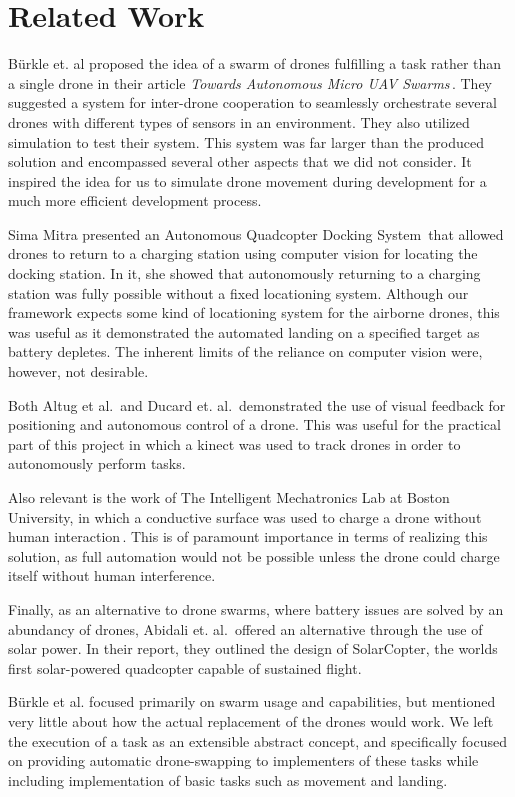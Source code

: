\section{Related Work}
B\"urkle et. al proposed the idea of a swarm of drones fulfilling a task rather than a single drone in their article \textit{Towards Autonomous Micro UAV Swarms}\,\cite{burkleetal}. They suggested a system for inter-drone cooperation to seamlessly orchestrate several drones with different types of sensors in an environment. They also utilized simulation to test their system. This system was far larger than the produced solution and encompassed several other aspects that we did not consider. It inspired the idea for us to simulate drone movement during development for a much more efficient development process.

Sima Mitra presented an Autonomous Quadcopter Docking System\,\cite{simamitra} that allowed drones to return to a charging station using computer vision for locating the docking station. In it, she showed that autonomously returning to a charging station was fully possible without a fixed locationing system. Although our framework expects some kind of locationing system for the airborne drones, this was useful as it demonstrated the automated landing on a specified target as battery depletes. The inherent limits of the reliance on computer vision were, however, not desirable.

Both Altug et al.\,\cite{altugetal} and Ducard et. al.\,\cite{ducardetal} demonstrated the use of visual feedback for positioning and autonomous control of a drone. This was useful for the practical part of this project in which a kinect was used to track drones in order to autonomously perform tasks.

Also relevant is the work of The Intelligent Mechatronics Lab at Boston University, in which a conductive surface was used to charge a drone without human interaction\,\cite{bostonuni}. This is of paramount importance in terms of realizing this solution, as full automation would not be possible unless the drone could charge itself without human interference.

Finally, as an alternative to drone swarms, where battery issues are solved by an abundancy of drones, Abidali et. al.\,\cite{solarcopter} offered an alternative through the use of solar power. In their report, they outlined the design of SolarCopter, the worlds first solar-powered quadcopter capable of sustained flight.

B\"urkle et al. focused primarily on swarm usage and capabilities, but mentioned very little about how the actual replacement of the drones would work. We left the execution of a task as an extensible abstract concept, and specifically focused on providing automatic drone-swapping to implementers of these tasks while including implementation of basic tasks such as movement and landing.

